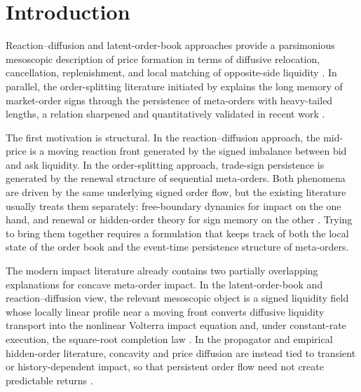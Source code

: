 \documentclass[5p,final]{elsarticle}
\begin{document}
\section{Introduction} \label{sec:intro}


Reaction--diffusion and latent-order-book approaches provide a parsimonious mesoscopic description of price formation in terms of diffusive relocation, cancellation, replenishment, and local matching of opposite-side liquidity \citep{toth2011anomalous,donier2015fully,benzaquen2018multi,bouchaud2018tqp}. In parallel, the order-splitting literature initiated by \citet{lillo2005theory} explains the long memory of market-order signs through the persistence of meta-orders with heavy-tailed lengths, a relation sharpened and quantitatively validated in recent work \citep{sato2023prl,sato2024jsp}. 

The first motivation is structural. In the reaction--diffusion approach, the mid-price is a moving reaction front generated by the signed imbalance between bid and ask liquidity. In the order-splitting approach, trade-sign persistence is generated by the renewal structure of sequential meta-orders. Both phenomena are driven by the same underlying signed order flow, but the existing literature usually treats them separately: free-boundary dynamics for impact on the one hand, and renewal or hidden-order theory for sign memory on the other \citep{lillo2005theory,donier2015fully,benzaquen2018multi}. Trying to bring them together requires a formulation that keeps track of both the local state of the order book and the event-time persistence structure of meta-orders.

The modern impact literature already contains two partially overlapping explanations for concave meta-order impact.  In the latent-order-book and reaction--diffusion view, the relevant mesoscopic object is a signed liquidity field whose locally linear profile near a moving front converts diffusive liquidity transport into the nonlinear Volterra impact equation and, under constant-rate execution, the square-root completion law \citep{toth2011anomalous,donier2015fully,benzaquen2018multi,bouchaud2018tqp}.  In the propagator and empirical hidden-order literature, concavity and price diffusion are instead tied to transient or history-dependent impact, so that persistent order flow need not create predictable returns \citep{bouchaud2004fluctuations,gatheral2010no,moro2009market,bershova2013nonlinear}. 
\end{document}
